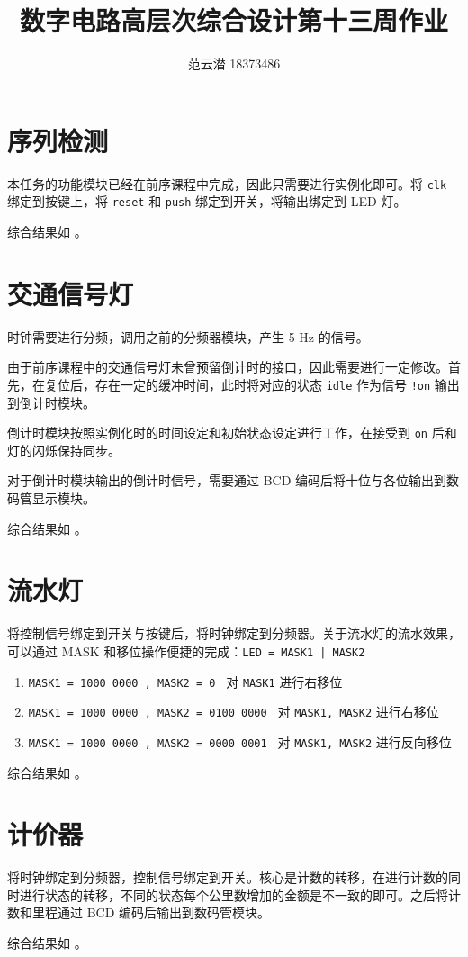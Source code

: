 \documentclass[lang=cn,11pt,a4paper,cite=authoryear]{elegantpaper}
\title{数字电路高层次综合设计\quad 第十三周作业}
\author{范云潜 18373486}
\institute{微电子学院 184111 班}
\date{\zhtoday}
\begin{document}
\maketitle

\tableofcontents

\section{序列检测}

本任务的功能模块已经在前序课程中完成，因此只需要进行实例化即可。将 \lstinline{clk} 绑定到按键上，将 \lstinline{reset} 和 \lstinline{push} 绑定到开关，将输出绑定到 LED 灯。

综合结果如  。 

\section{交通信号灯}

时钟需要进行分频，调用之前的分频器模块，产生 5 Hz 的信号。

由于前序课程中的交通信号灯未曾预留倒计时的接口，因此需要进行一定修改。首先，在复位后，存在一定的缓冲时间，此时将对应的状态 \lstinline{idle} 作为信号 \lstinline{!on} 输出到倒计时模块。

倒计时模块按照实例化时的时间设定和初始状态设定进行工作，在接受到 \lstinline{on} 后和灯的闪烁保持同步。

对于倒计时模块输出的倒计时信号，需要通过 BCD 编码后将十位与各位输出到数码管显示模块。

综合结果如  。 

\section{流水灯}

将控制信号绑定到开关与按键后，将时钟绑定到分频器。关于流水灯的流水效果，可以通过 MASK 和移位操作便捷的完成：\lstinline{LED = MASK1 | MASK2}

\begin{enumerate}
    \item \lstinline{MASK1 = 1000 0000 , MASK2 = 0 } 对 \lstinline{MASK1} 进行右移位
    \item \lstinline{MASK1 = 1000 0000 , MASK2 = 0100 0000 } 对 \lstinline{MASK1, MASK2} 进行右移位
    \item \lstinline{MASK1 = 1000 0000 , MASK2 = 0000 0001 } 对 \lstinline{MASK1, MASK2} 进行反向移位
\end{enumerate}

综合结果如  。 

\section{计价器}

将时钟绑定到分频器，控制信号绑定到开关。核心是计数的转移，在进行计数的同时进行状态的转移，不同的状态每个公里数增加的金额是不一致的即可。之后将计数和里程通过 BCD 编码后输出到数码管模块。

综合结果如  。 

\end{document}
